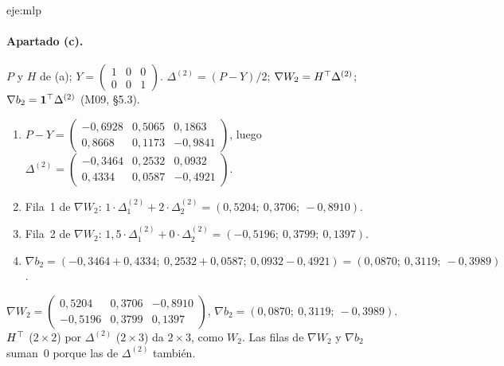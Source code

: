 \begin{solucion}{eje:mlp}
\paragraph{Apartado (c).}
\datos $P$ y $H$ de (a); $Y=\begin{pmatrix}1&0&0\\0&0&1\end{pmatrix}$.
\planteamiento $\Delta^{(2)}=(P-Y)/2$; $\nabla W_2=H^{\top}\Delta^{(2)}$; $\nabla b_2=\mathbf{1}^{\top}\Delta^{(2)}$ (M09, §5.3).
\pasos
\begin{enumerate}[label=\arabic*.]
  \item $P-Y=\begin{pmatrix}-0{,}6928&0{,}5065&0{,}1863\\0{,}8668&0{,}1173&-0{,}9841\end{pmatrix}$, luego $\Delta^{(2)}=\begin{pmatrix}-0{,}3464&0{,}2532&0{,}0932\\0{,}4334&0{,}0587&-0{,}4921\end{pmatrix}$.
  \item Fila~1 de $\nabla W_2$: $1\cdot\Delta^{(2)}_1+2\cdot\Delta^{(2)}_2=(0{,}5204;\allowbreak\ 0{,}3706;\allowbreak\ -0{,}8910)$.
  \item Fila~2 de $\nabla W_2$: $1{,}5\cdot\Delta^{(2)}_1+0\cdot\Delta^{(2)}_2=(-0{,}5196;\allowbreak\ 0{,}3799;\allowbreak\ 0{,}1397)$.
  \item $\nabla b_2=(-0{,}3464+0{,}4334;\allowbreak\ 0{,}2532+0{,}0587;\allowbreak\ 0{,}0932-0{,}4921)=(0{,}0870;\allowbreak\ 0{,}3119;\allowbreak\ -0{,}3989)$.
\end{enumerate}
\resultado $\nabla W_2=\begin{pmatrix}0{,}5204&0{,}3706&-0{,}8910\\-0{,}5196&0{,}3799&0{,}1397\end{pmatrix}$, $\nabla b_2=(0{,}0870;\allowbreak\ 0{,}3119;\allowbreak\ -0{,}3989)$.
\comprobacion $H^{\top}$ ($2\times2$) por $\Delta^{(2)}$ ($2\times3$) da $2\times3$, como $W_2$. Las filas de $\nabla W_2$ y $\nabla b_2$ suman~0 porque las de $\Delta^{(2)}$ también.


\end{solucion}
